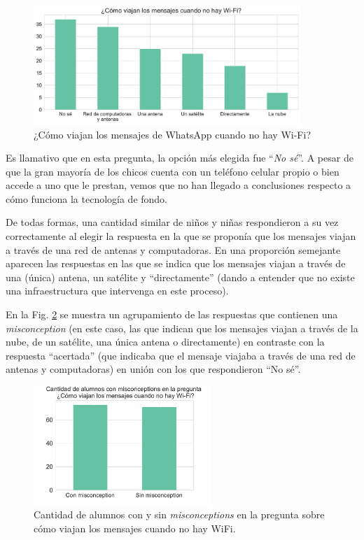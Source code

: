 \begin{figure}[h]
    \centering
    \includegraphics[width=0.9\textwidth]{images_analisis/19.pdf}
    \caption{¿Cómo viajan los mensajes de WhatsApp cuando no hay Wi-Fi?}
    \label{fig:analisis19}
\end{figure}

Es llamativo que en esta pregunta, la opción más elegida fue ``\textit{No sé}''. A pesar de que la gran mayoría de los chicos cuenta con un teléfono celular propio o bien accede a uno que le prestan, vemos que no han llegado a conclusiones respecto a cómo funciona la tecnología de fondo.

De todas formas, una cantidad similar de niños y niñas respondieron a su vez correctamente al elegir la respuesta en la que se proponía que los mensajes viajan a través de una red de antenas y computadoras.
En una proporción semejante aparecen las respuestas en las que se indica que los mensajes viajan a través de una (única) antena, un satélite y ``directamente'' (dando a entender que no existe una infraestructura que intervenga en este proceso).

En la Fig. \ref{fig:analisis20} se muestra un agrupamiento de las respuestas que contienen una \textit{misconception} (en este caso, las que indican que los mensajes viajan a través de la nube, de un satélite, una única antena o directamente) en contraste con la respuesta ``acertada'' (que indicaba que el mensaje viajaba a través de una red de antenas y computadoras) en unión con los que respondieron ``No sé''.

\begin{figure}[h]
    \centering
    \includegraphics[width=0.6\textwidth]{images_analisis/20.pdf}
    \caption{Cantidad de alumnos con y sin \textit{misconceptions} en la pregunta sobre cómo viajan los mensajes cuando no hay WiFi.}
    \label{fig:analisis20}
\end{figure}

